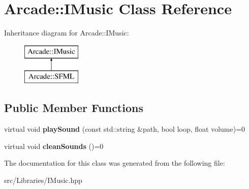 \hypertarget{class_arcade_1_1_i_music}{}\section{Arcade\+:\+:I\+Music Class Reference}
\label{class_arcade_1_1_i_music}
Inheritance diagram for Arcade\+:\+:I\+Music\+:\begin{figure}[H]
\begin{center}
\leavevmode
\includegraphics[height=2.000000cm]{class_arcade_1_1_i_music}
\end{center}
\end{figure}
\subsection*{Public Member Functions}
\begin{DoxyCompactItemize}
\item 
\mbox{\label{class_arcade_1_1_i_music_a12467cea18f1d76fd2d7ff9725ea9f11}} 
virtual void {\bfseries play\+Sound} (const std\+::string \&path, bool loop, float volume)=0
\item 
\mbox{\label{class_arcade_1_1_i_music_a7c58da4b2c4396e878dc90ee0820bbcb}} 
virtual void {\bfseries clean\+Sounds} ()=0
\end{DoxyCompactItemize}


The documentation for this class was generated from the following file\+:\begin{DoxyCompactItemize}
\item 
src/\+Libraries/I\+Music.\+hpp\end{DoxyCompactItemize}
